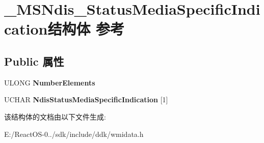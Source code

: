 \hypertarget{struct___m_s_ndis___status_media_specific_indication}{}\section{\+\_\+\+M\+S\+Ndis\+\_\+\+Status\+Media\+Specific\+Indication结构体 参考}
\label{struct___m_s_ndis___status_media_specific_indication}
\subsection*{Public 属性}
\begin{DoxyCompactItemize}
\item 
\mbox{\label{struct___m_s_ndis___status_media_specific_indication_a8be18d5fec4307d9f94b8e113436ecd3}} 
U\+L\+O\+NG {\bfseries Number\+Elements}
\item 
\mbox{\label{struct___m_s_ndis___status_media_specific_indication_a5c461833bf32fe77482c76788fa63ff3}} 
U\+C\+H\+AR {\bfseries Ndis\+Status\+Media\+Specific\+Indication} \mbox{[}1\mbox{]}
\end{DoxyCompactItemize}


该结构体的文档由以下文件生成\+:\begin{DoxyCompactItemize}
\item 
E\+:/\+React\+O\+S-\/0../sdk/include/ddk/wmidata.\+h\end{DoxyCompactItemize}
